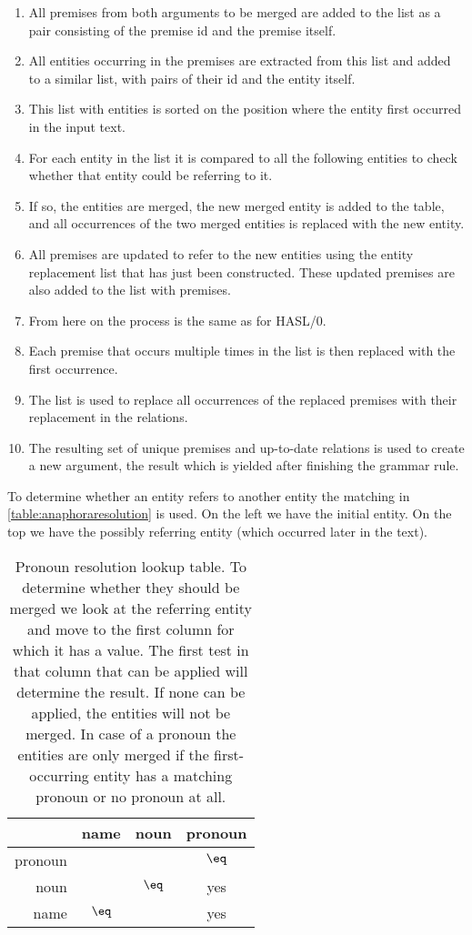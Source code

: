 \begin{enumerate}
    \item All premises from both arguments to be merged are added to the list as a pair consisting of the premise id and the premise itself.
    \item All entities occurring in the premises are extracted from this list and added to a similar list, with pairs of their id and the entity itself.
    \item This list with entities is sorted on the position where the entity first occurred in the input text.
    \item For each entity in the list it is compared to all the following entities to check whether that entity could be referring to it.
    \item If so, the entities are merged, the new merged entity is added to the table, and all occurrences of the two merged entities is replaced with the new entity.
    \item All premises are updated to refer to the new entities using the entity replacement list that has just been constructed. These updated premises are also added to the list with premises. 
    \item From here on the process is the same as for HASL/0.
    \item Each premise that occurs multiple times in the list is then replaced with the first occurrence.
    \item The list is used to replace all occurrences of the replaced premises with their replacement in the relations.
    \item The resulting set of unique premises and up-to-date relations is used to create a new argument, the result which is yielded after finishing the grammar rule.
\end{enumerate}

To determine whether an entity refers to another entity the matching in \autoref{table:anaphoraresolution} is used. On the left we have the initial entity. On the top we have the possibly referring entity (which occurred later in the text).

\begin{table}
    \begin{tabular}{r|ccc|}
                & name  & noun  & pronoun \\
        \hline
        pronoun &       &       & $\eq$ \\
        noun    &       & $\eq$ & yes \\
        name    & $\eq$ &       & yes \\
        \hline
    \end{tabular}
    \caption{Pronoun resolution lookup table. To determine whether they should be merged we look at the referring entity and move to the first column for which it has a value. The first test in that column that can be applied will determine the result. If none can be applied, the entities will not be merged. In case of a pronoun the entities are only merged if the first-occurring entity has a matching pronoun or no pronoun at all.}
    \label{table:anaphoraresolution}
\end{table}

